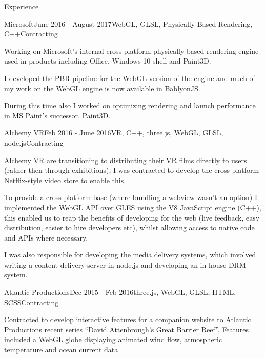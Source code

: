 \documentclass{resume} %
\begin{document}
\begin{rSection}{Experience}

\begin{rSubsection}{Microsoft}{June 2016 - August 2017}{WebGL, GLSL, Physically Based Rendering, C++}{Contracting}
\item Working on Microsoft's internal cross-platform physically-based rendering engine used in products including Office, Windows 10 shell and Paint3D.
\item I developed the PBR pipeline for the WebGL version of the engine and much of my work on the WebGL engine is now available in \href{https://www.babylonjs.com/demos/pbrglossy/}{BablyonJS}.
\item During this time also I worked on optimizing rendering and launch performance in MS Paint's successor, Paint3D.
\end{rSubsection}

\begin{rSubsection}{Alchemy VR}{Feb 2016 - June 2016}{VR, C++, three.js, WebGL, GLSL, node.js}{Contracting}
\item \href{http://www.alchemyvr.com/}{Alchemy VR} are transitioning to distributing their VR films directly to users (rather then through exhibitions), I was contracted to develop the cross-platform Netflix-style video store to enable this.
\item To provide a cross-platform base (where bundling a webview wasn't an option) I implemented the WebGL API over GLES using the V8 JavaScript engine (C++), this enabled us to reap the benefits of developing for the web (live feedback, easy distribution, easier to hire developers etc), whilst allowing access to native code and APIs where necessary.
\item I was also responsible for developing the media delivery systems, which involved writing a content delivery server in node.js and developing an in-house DRM system.
\end{rSubsection}

\begin{rSubsection}{Atlantic Productions}{Dec 2015 - Feb 2016}{three.js, WebGL, GLSL, HTML, SCSS}{Contracting}
\item Contracted to develop interactive features for a companion website to \href{http://www.atlanticproductions.tv/}{Atlantic Productions} recent series ``David Attenbrough's Great Barrier Reef''. Features included a \href{http://attenboroughsreef.com/_mobile/interactive_weather_globe.php}{WebGL globe displaying animated wind flow, atmospheric temperature and ocean current data}
\end{rSubsection}


\end{rSection}
\end{document}
